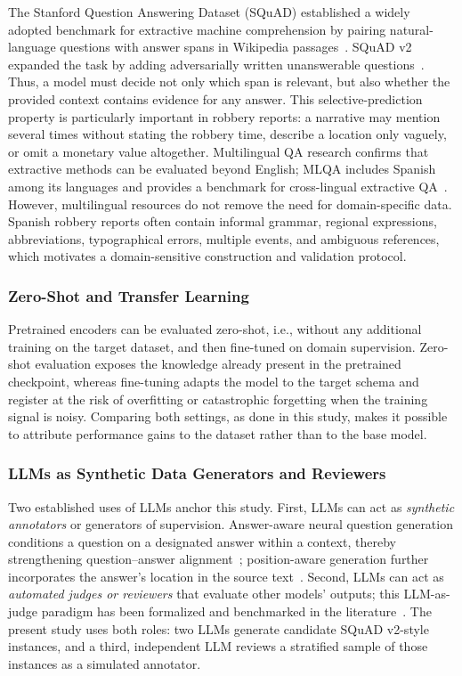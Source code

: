 \documentclass[graybox]{SNmult}
\begin{document}
The Stanford Question Answering Dataset (SQuAD) established a widely adopted
benchmark for extractive machine comprehension by pairing natural-language
questions with answer spans in Wikipedia passages~\cite{rajpurkar2016squad}.
SQuAD v2 expanded the task by adding adversarially written unanswerable
questions~\cite{rajpurkar2018know}. Thus, a model must decide not only which
span is relevant, but also whether the provided context contains evidence for
any answer. This selective-prediction property is particularly important in
robbery reports: a narrative may mention several times without stating the
robbery time, describe a location only vaguely, or omit a monetary value
altogether. Multilingual QA research confirms that extractive methods can be
evaluated beyond English; MLQA includes Spanish among its languages and
provides a benchmark for cross-lingual extractive QA~\cite{lewis2020mlqa}.
However, multilingual resources do not remove the need for domain-specific
data. Spanish robbery reports often contain informal grammar, regional
expressions, abbreviations, typographical errors, multiple events, and
ambiguous references, which motivates a domain-sensitive construction and
validation protocol.

\subsubsection{Zero-Shot and Transfer Learning}

Pretrained encoders can be evaluated zero-shot, i.e., without any additional
training on the target dataset, and then fine-tuned on domain supervision.
Zero-shot evaluation exposes the knowledge already present in the pretrained
checkpoint, whereas fine-tuning adapts the model to the target schema and
register at the risk of overfitting or catastrophic forgetting when the
training signal is noisy. Comparing both settings, as done in this study, makes
it possible to attribute performance gains to the dataset rather than to the
base model.

\subsubsection{LLMs as Synthetic Data Generators and Reviewers}

Two established uses of LLMs anchor this study. First, LLMs can act as
\textit{synthetic annotators} or generators of supervision. Answer-aware neural
question generation conditions a question on a designated answer within a
context, thereby strengthening question--answer alignment~\cite{zhou2017neuralqg};
position-aware generation further incorporates the answer's location in the
source text~\cite{sun2018answerfocused}. Second, LLMs can act as
\textit{automated judges or reviewers} that evaluate other models' outputs;
this LLM-as-judge paradigm has been formalized and benchmarked in the
literature~\cite{zheng2023judge}. The present study uses both roles: two LLMs
generate candidate SQuAD v2-style instances, and a third, independent LLM
reviews a stratified sample of those instances as a simulated annotator.
\end{document}
